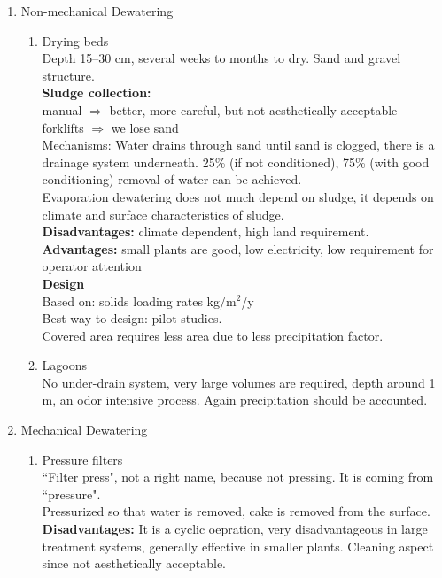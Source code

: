 \documentclass{article}
\numberwithin{equation}{section}
\begin{document}
\begin{enumerate}
    \item Non-mechanical Dewatering
    \begin{enumerate}
        \item Drying beds\\
        Depth 15--30 cm, several weeks to months to dry. Sand and gravel structure.\\
        \textbf{Sludge collection:}\\
        manual $\Rightarrow$ better, more careful, but not aesthetically acceptable\\
        forklifts $\Rightarrow$ we lose sand\\
        Mechanisms:
        Water drains through sand until sand is clogged, there is a drainage system underneath. 25\% (if not conditioned), 75\% (with good conditioning) removal of water can be achieved.\\
        Evaporation dewatering does not much depend on sludge, it depends on climate and surface characteristics of sludge.\\
        \textbf{Disadvantages:} climate dependent, high land requirement.\\
        \textbf{Advantages:} small plants are good, low electricity, low requirement for operator attention\\
        \textbf{Design}\\
        Based on: solids loading rates kg/m$^2$/y\\
        Best way to design: pilot studies.\\
        Covered area requires less area due to less precipitation factor.
        \item Lagoons\\
        No under-drain system, very large volumes are required, depth around 1 m, an odor intensive process. Again precipitation should be accounted.
    \end{enumerate}
    \item Mechanical Dewatering
    \begin{enumerate}
        \item Pressure filters\\
        ``Filter press", not a right name, because not pressing. It is coming from ``pressure".\\
        Pressurized so that water is removed, cake is removed from the surface.\\
        \textbf{Disadvantages:} It is a cyclic oepration, very disadvantageous in large treatment systems, generally effective in smaller plants. Cleaning aspect since not aesthetically acceptable.\\

\end{enumerate}
\end{enumerate}
\end{document}
